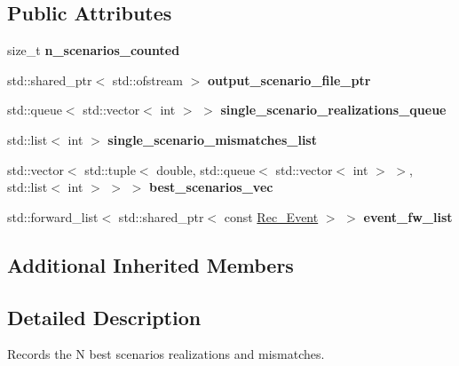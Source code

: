 \subsection*{Public Attributes}
\begin{DoxyCompactItemize}
\item 
\mbox{\label{classBest__scenarios__counter_abd0c0c2c1a2ac326b3897c7e9badad21}} 
size\+\_\+t {\bfseries n\+\_\+scenarios\+\_\+counted}
\item 
\mbox{\label{classBest__scenarios__counter_a81323e4e4b6a1175da9370992297209a}} 
std\+::shared\+\_\+ptr$<$ std\+::ofstream $>$ {\bfseries output\+\_\+scenario\+\_\+file\+\_\+ptr}
\item 
\mbox{\label{classBest__scenarios__counter_abe8aa0d16e4fa62041df503a040e9428}} 
std\+::queue$<$ std\+::vector$<$ int $>$ $>$ {\bfseries single\+\_\+scenario\+\_\+realizations\+\_\+queue}
\item 
\mbox{\label{classBest__scenarios__counter_aaf1861459f6ef157ef87a3c53380d917}} 
std\+::list$<$ int $>$ {\bfseries single\+\_\+scenario\+\_\+mismatches\+\_\+list}
\item 
\mbox{\label{classBest__scenarios__counter_a6bb048e0cdacc5a6659a8c535c3c76fc}} 
std\+::vector$<$ std\+::tuple$<$ double, std\+::queue$<$ std\+::vector$<$ int $>$ $>$, std\+::list$<$ int $>$ $>$ $>$ {\bfseries best\+\_\+scenarios\+\_\+vec}
\item 
\mbox{\label{classBest__scenarios__counter_ab397a09b97161f3db1eb962759f4079d}} 
std\+::forward\+\_\+list$<$ std\+::shared\+\_\+ptr$<$ const \hyperlink{classRec__Event}{Rec\+\_\+\+Event} $>$ $>$ {\bfseries event\+\_\+fw\+\_\+list}
\end{DoxyCompactItemize}
\subsection*{Additional Inherited Members}


\subsection{Detailed Description}
Records the N best scenarios realizations and mismatches. 

